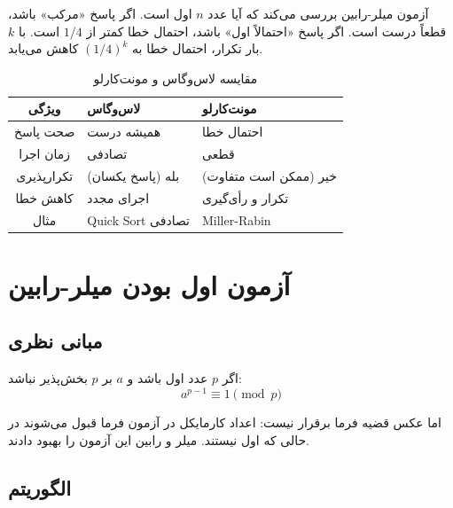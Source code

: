 \documentclass{matinbook}
\begin{document}
    \begin{example}
        آزمون میلر-رابین
        بررسی می‌کند که آیا عدد $n$ اول است.
        اگر پاسخ «مرکب» باشد، قطعاً درست است.
        اگر پاسخ «احتمالاً اول» باشد،
        احتمال خطا کمتر از $1/4$ است.
        با $k$ بار تکرار، احتمال خطا
        به $(1/4)^{k}$ کاهش می‌یابد.
        \label{ex:miller-rabin}
    \end{example}
    
    \begin{table}[h]
        \centering
        \caption{مقایسه لاس‌وگاس و مونت‌کارلو}
        \label{tab:lasvegas-montecarlo}
        \begin{tabular}{|c|C{4cm}|C{4cm}|}
            \hline
            \textbf{ویژگی} & \textbf{لاس‌وگاس} & \textbf{مونت‌کارلو} \\
            \hline
            صحت پاسخ & همیشه درست & احتمال خطا \\
            زمان اجرا & تصادفی & قطعی \\
            تکرارپذیری & بله (پاسخ یکسان) & خیر (ممکن است متفاوت) \\
            کاهش خطا & اجرای مجدد & تکرار و رأی‌گیری \\
            مثال & Quick Sort تصادفی & Miller-Rabin \\
            \hline
        \end{tabular}
    \end{table}
    
    \section{آزمون اول بودن میلر-رابین}
    
    \subsection{مبانی نظری}
    
    \begin{theorem}
        اگر $p$ عدد اول باشد و $a$ بر $p$ بخش‌پذیر نباشد:
        \[
        a^{p-1} \equiv 1 \pmod{p}
        \]
        \label{thm:fermat-little}
    \end{theorem}
    
    اما عکس قضیه فرما برقرار نیست:
    اعداد کارمایکل
    در آزمون فرما قبول می‌شوند در حالی که اول نیستند.
    میلر و رابین این آزمون را بهبود دادند.
    
    \subsection{الگوریتم}
    
\end{document}
